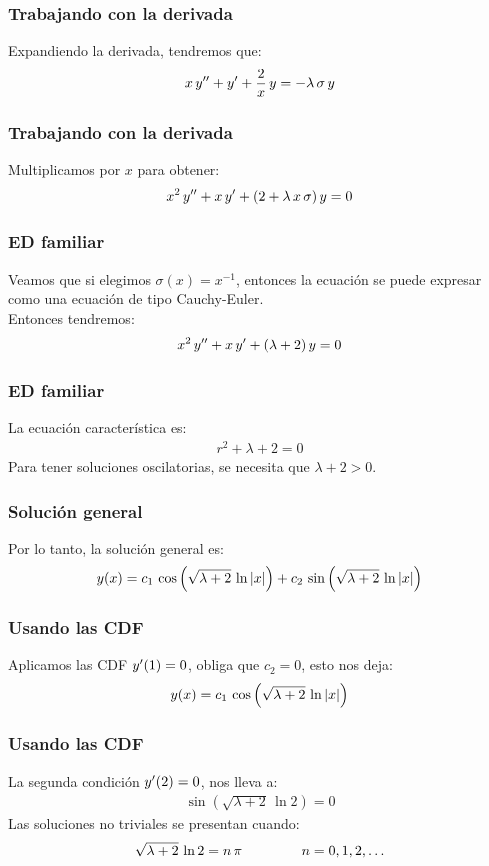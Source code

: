 \documentclass[12pt]{beamer}
\begin{document}
\begin{frame}
\frametitle{Trabajando con la derivada}
Expandiendo la derivada, tendremos que:
\pause
\begin{align*}
x \, {y}^{\prime \prime} + {y}^{\prime} + \dfrac{2}{x} \, y = - \lambda \, \sigma \, y
\end{align*}
\end{frame}
\begin{frame}
\frametitle{Trabajando con la derivada}
Multiplicamos por $x$ para obtener:
\pause
\begin{align*}
x^{2} \, {y}^{\prime \prime} + x \, {y}^{\prime} + (2 + \lambda \, x \,  \sigma) \, y = 0
\end{align*}
\end{frame}
\begin{frame}
\frametitle{ED familiar}
Veamos que si elegimos $\sigma(x) = x^{-1}$, entonces la ecuación se puede expresar como una ecuación de tipo Cauchy-Euler.
\\
\bigskip
\pause
Entonces tendremos:
\pause
\begin{align*}
x^{2} \, {y}^{\prime \prime} + x \, {y}^{\prime} + (\lambda + 2) \, y = 0
\end{align*}
\end{frame}
\begin{frame}
\frametitle{ED familiar}
La ecuación característica es:
\pause
\begin{align*}
r^{2} + \lambda + 2 = 0
\end{align*}
\pause
Para tener soluciones oscilatorias, se necesita que $\lambda + 2 > 0$.
\end{frame}
\begin{frame}
\frametitle{Solución general}
Por lo tanto, la solución general es:
\pause
\begin{align}
y(x) = c_{1} \, \cos \left( \sqrt{\lambda + 2} \, \ln \abs{x} \right) + c_{2} \, \sin \left( \sqrt{\lambda + 2} \, \ln \abs{x} \right)
\label{eq:ecuacion_04_15}
\end{align}
\end{frame}
\begin{frame}
\frametitle{Usando las CDF}
Aplicamos las CDF ${y}^{\prime}(1) = 0$, \pause obliga que $c_{2} = 0$, esto nos deja:
\pause
\begin{align*}
y(x) = c_{1} \, \cos \left( \sqrt{\lambda + 2} \, \ln \abs{x} \right)
\end{align*}
\end{frame}
\begin{frame}
\frametitle{Usando las CDF}
La segunda condición ${y}^{\prime}(2) = 0$, nos lleva a:
\pause
\begin{align*}
\sin \left( \sqrt{\lambda + 2} \, \ln 2 \right) = 0
\end{align*}
\pause
Las soluciones no triviales se presentan cuando:
\pause
\begin{align*}
\sqrt{\lambda + 2} \, \ln 2 = n \, \pi \hspace{1.5cm} n = 0, 1, 2, \ldots
\end{align*}
\end{frame}
\end{document}
